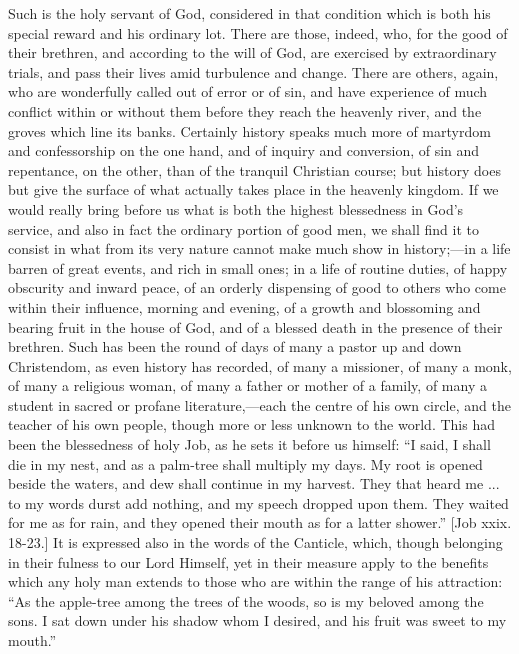 Such is the holy servant of God, considered in that
condition which is both his special reward and his
ordinary lot. There are those, indeed, who, for the good
of their brethren, and according to the will of God, are
exercised by extraordinary trials, and pass their lives
amid turbulence and change. There are others, again, who
are wonderfully called out of error or of sin, and have
experience of much conflict within or without them before
they reach the heavenly river, and the groves which line
its banks. Certainly history speaks much more of
martyrdom and confessorship on the one hand, and of
inquiry and conversion, of sin and repentance, on the
other, than of the tranquil Christian course; but history
does but give the surface of what actually takes place in
the heavenly kingdom. If we would really bring before us
what is both the highest blessedness in God's service,
and also in fact the ordinary portion of good men, we
shall find it to consist in what from its very nature
cannot make much show in history;—in a life barren
of great events, and rich in small ones; in a life of
routine duties, of happy obscurity and inward peace, of
an orderly dispensing of good to others who come within
their influence, morning and evening, of a growth and
blossoming and bearing fruit in the house of God, and of
a blessed death in the presence of their brethren. Such
has been the round of days of many a pastor up and down
Christendom, as even history has recorded, of many a
missioner, of many a monk, of many a religious woman, of
many a father or mother of a family, of many a student in
sacred or profane literature,—each the centre of his
own circle, and the teacher of his own people, though
more or less unknown to the world. This had been the
blessedness of holy Job, as he sets it before us himself:
``I said, I shall die in my nest, and as a palm-tree
shall multiply my days. My root is opened beside the
waters, and dew shall continue in my harvest. They that
heard me ... to my words durst add nothing, and my speech
dropped upon them. They waited for me as for rain, and
they opened their mouth as for a latter shower.''
[Job xxix. 18-23.] It is expressed also in the words of
the Canticle, which, though belonging in their fulness to
our Lord Himself, yet in their measure apply to the
benefits which any holy man extends to those who are
within the range of his attraction: ``As the
apple-tree among the trees of the woods, so is my beloved
among the sons. I sat down under his shadow whom I
desired, and his fruit was sweet to my mouth.''

